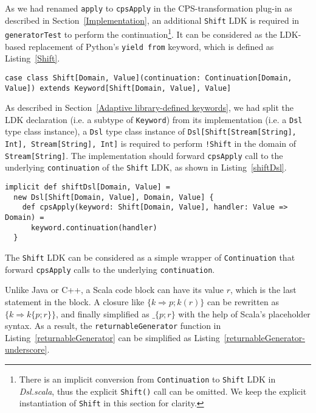 As we had renamed \lstinline{apply} to \lstinline{cpsApply} in the CPS-transformation plug-in as described in Section~\ref{Implementation},  an additional \lstinline{Shift} LDK is required in \lstinline{generatorTest} to perform the continuation\footnote{There is an implicit conversion from \lstinline{Continuation} to \lstinline{Shift} LDK in \textit{Dsl.scala}, thus the explicit \lstinline{Shift()} call can be omitted. We keep the explicit instantiation of \lstinline{Shift} in this section for clarity.}. It can be considered as the LDK-based replacement of Python's \lstinline{yield from} keyword, which is defined as Listing~\ref{Shift}.

\begin{lstlisting}[caption={The definition of \lstinline{Shift} LDK},label={Shift}]
case class Shift[Domain, Value](continuation: Continuation[Domain, Value]) extends Keyword[Shift[Domain, Value], Value]
\end{lstlisting}

As described in Section~\ref{Adaptive library-defined keywords}, we had split the LDK declaration (i.e. a subtype of \lstinline{Keyword}) from its implementation (i.e. a \lstinline{Dsl} type class instance), a \lstinline{Dsl} type class instance of \lstinline{Dsl[Shift[Stream[String], Int], Stream[String], Int]} is required to perform \lstinline{!Shift} in the domain of \lstinline{Stream[String]}. The implementation should forward \lstinline{cpsApply} call to the underlying \lstinline{continuation} of the \lstinline{Shift} LDK, as shown in Listing~\ref{shiftDsl}.

\begin{lstlisting}[caption={The \lstinline{Dsl} instance of \lstinline{Shift} LDK, to forward \lstinline{cpsApply} to underlying \lstinline{continuation}},label={shiftDsl}]
implicit def shiftDsl[Domain, Value] =
  new Dsl[Shift[Domain, Value], Domain, Value] {
    def cpsApply(keyword: Shift[Domain, Value], handler: Value => Domain) =
      keyword.continuation(handler)
  }
\end{lstlisting}

The \lstinline{Shift} LDK can be considered as a simple wrapper of \lstinline{Continuation} that forward \lstinline{cpsApply} calls to the underlying \lstinline{continuation}.

Unlike Java or C++, a Scala code block can have its value $r$, which is the last statement in the block. A closure like $\{ k \Rightarrow p; k(r) \}$ can be rewritten as $\{ k \Rightarrow k \{ p; r \} \}$, and finally simplified as $\_ \{ p; r \}$ with the help of Scala's placeholder syntax. As a result, the \lstinline{returnableGenerator} function in Listing~\ref{returnableGenerator} can be simplified as Listing~\ref{returnableGenerator-underscore}.

